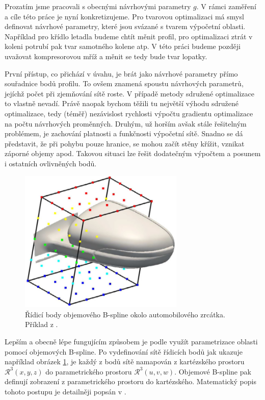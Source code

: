 Prozatím jsme pracovali s obecnými návrhovými parametry $ g $. V rámci zaměření a cíle této práce je nyní konkretizujeme. Pro tvarovou optimalizaci má smysl definovat návrhové parametry, které jsou svázané s tvarem výpočetní oblasti. Například pro křídlo letadla budeme chtít měnit profil, pro optimalizaci ztrát v koleni potrubí pak tvar samotného kolene atp. V této práci budeme později uvažovat kompresorovou mříž a měnit se tedy bude tvar lopatky.

První přístup, co přichází v úvahu, je brát jako návrhové parametry přímo souřadnice bodů profilu. To ovšem znamená spoustu návrhových parametrů, jejíchž počet při zjemňování sítě roste. V případě metody sdružené optimalizace to vlastně nevadí. Právě naopak bychom těžili tu největší výhodu sdružené optimalizace, tedy (téměř) nezávislost rychlosti výpočtu gradientu optimalizace na počtu návrhových proměnných. Druhým, už horším avšak stále řešitelným problémem, je zachování platnosti a funkčnosti výpočetní sítě. Snadno se dá představit, že při pohybu pouze hranice, se mohou začít stěny křížit, vznikat záporné objemy apod. Takovou situaci lze řešit dodatečným výpočtem a posunem i ostatních ovlivněných bodů. 
\begin{figure}
	\includegraphics[width=0.7\textwidth]{./img/ridici_body.png}
	\caption[Řídicí body objemového B-spline ve 3D]{Řídicí body objemového B-spline okolo automobilového zrcátka. Příklad z \cite{papoutsis2015noise}.}
	\label{fig:zrcatko}
\end{figure}
Lepším a obecně lépe fungujícím způsobem je podle \cite{adjoint2020foam} využít parametrizace oblasti pomocí objemových B-spline.
Po vydefinování sítě řídicích bodů jak ukazuje například obrázek \ref{fig:zrcatko}, je každý z bodů sítě namapován z kartézského prostoru $ \mathcal{R}^3(x,y,z) $ do parametrického prostoru $ \mathcal{R}^3(u,v,w) $.
Objemové B-spline pak definují zobrazení z parametrického prostoru do kartézského. 
Matematický popis tohoto postupu je detailněji popsán v \cite{papoutsis2015noise}. 

